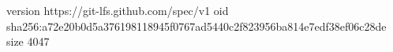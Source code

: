 version https://git-lfs.github.com/spec/v1
oid sha256:a72e20b0d5a376198118945f0767ad5440c2f823956ba814e7edf38ef06c28de
size 4047
